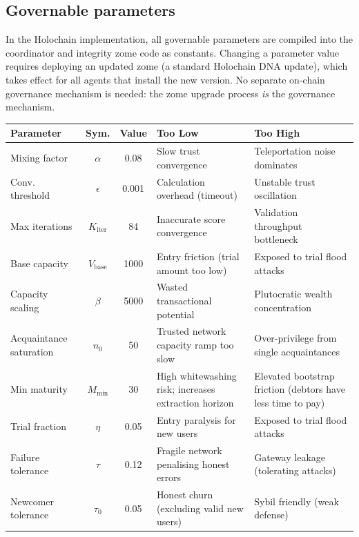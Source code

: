 \documentclass[11pt]{article}
\begin{document}
\subsection{Governable parameters}
\label{sec:parameters}

In the Holochain implementation, all governable parameters are compiled into the coordinator and integrity zome code as constants. Changing a parameter value requires deploying an updated zome (a standard Holochain DNA update), which takes effect for all agents that install the new version. No separate on-chain governance mechanism is needed: the zome upgrade process \emph{is} the governance mechanism.

\begin{center}
\scriptsize
\renewcommand{\arraystretch}{0.95}
\setlength{\tabcolsep}{3pt}
\begin{tabular}{|l|c|c|>{\raggedright\arraybackslash}p{3.1cm}|>{\raggedright\arraybackslash}p{3.1cm}|}
\hline
\textbf{Parameter} & \textbf{Sym.} & \textbf{Value} & \textbf{Too Low} & \textbf{Too High} \\
\hline
Mixing factor & $\alpha$ & 0.08 & Slow trust convergence & Teleportation noise dominates \\
Conv. threshold & $\epsilon$ & 0.001 & Calculation overhead (timeout) & Unstable trust oscillation \\
Max iterations & $K_{\text{iter}}$ & 84 & Inaccurate score convergence & Validation throughput bottleneck \\
Base capacity & $V_{\text{base}}$ & 1000 & Entry friction (trial amount too low) & Exposed to trial flood attacks \\
Capacity scaling & $\beta$ & 5000 & Wasted transactional potential & Plutocratic wealth concentration \\
Acquaintance saturation & $n_0$ & 50 & Trusted network capacity ramp too slow & Over-privilege from single acquaintances \\
Min maturity & $M_{\min}$ & 30 & High whitewashing risk; increases extraction horizon & Elevated bootstrap friction (debtors have less time to pay) \\
Trial fraction & $\eta$ & 0.05 & Entry paralysis for new users & Exposed to trial flood attacks \\
Failure tolerance & $\tau$ & 0.12 & Fragile network penalising honest errors & Gateway leakage (tolerating attacks) \\
Newcomer tolerance & $\tau_0$ & 0.05 & Honest churn (excluding valid new users) & Sybil friendly (weak defense) \\

\end{tabular}
\end{center}
\end{document}
